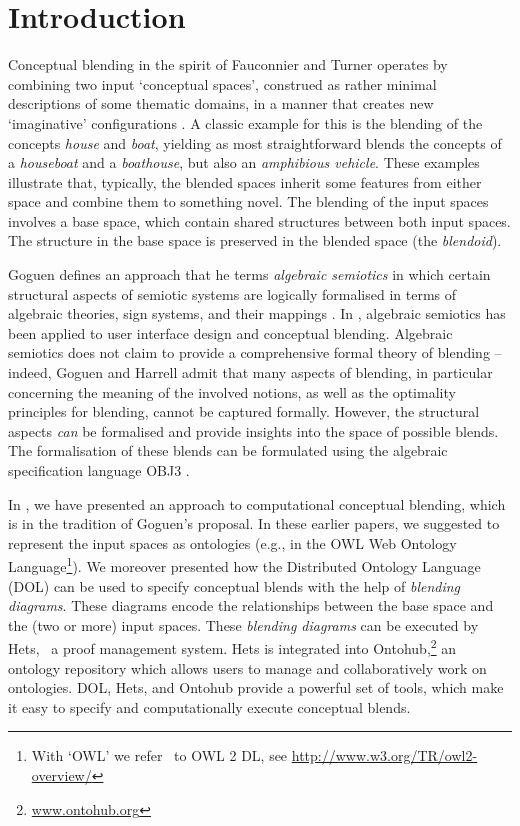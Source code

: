 \documentclass{ecai2012}
\newcommand{\OWL}{\textmd{\textsc{OWL}}\xspace}
\begin{document}
\section{Introduction}

Conceptual blending in the spirit of Fauconnier and Turner operates by
combining two input `conceptual spaces', construed as rather minimal
descriptions of some thematic domains, in a manner that creates new
`imaginative' configurations \citep{FauconnierTurner2003,Turner2014}. A classic example for this is the
blending of the concepts \emph{house} and \emph{boat}, yielding as
most straightforward blends the concepts of a \emph{houseboat} and a
\emph{boathouse}, but also an \emph{amphibious vehicle}. These examples
 illustrate that, typically, the blended spaces inherit some features from
  either space and combine them to something novel. The blending of the input 
spaces involves a base space, which contain shared structures between both input spaces. 
The structure in the base space is preserved in the blended space (the \emph{blendoid}). 

Goguen defines an approach that he terms \emph{algebraic semiotics} in 
 which certain structural aspects of semiotic systems are logically
  formalised in terms of algebraic theories, sign systems, and their mappings \citep{Goguen99}. 
%
In \cite{goguenharrell10}, algebraic
semiotics has been applied to user interface design and conceptual blending.
 Algebraic semiotics does not claim to provide a comprehensive formal theory of blending 
 -- indeed, Goguen and Harrell admit that many  aspects of blending, in particular concerning
  the meaning of the involved notions, as well as the optimality principles for blending, 
  cannot be captured formally.  However, the structural
aspects \emph{can} be formalised and provide insights into the space of possible blends. 
The formalisation of these blends can be formulated  using the algebraic specification language OBJ3 \citep{GoguenMalcolm96}. 


In \cite{HoisEtAl2010,blendingc3gi12,iccc14-ontohub}, we have presented an approach to computational conceptual blending,  which is in the tradition of Goguen's proposal. In these earlier papers, we suggested to represent the input  spaces as ontologies (e.g., in the OWL Web Ontology Language\footnote{With `\OWL' we refer \ to \OWL 2 DL, see \url{http://www.w3.org/TR/owl2-overview/}}). We moreover presented how  the Distributed Ontology Language (DOL) can be used to specify conceptual blends with the help
  of \emph{blending diagrams}. These diagrams encode the relationships between the base space 
  and the (two or more) input spaces. These \emph{blending diagrams} can be executed by Hets,
  \ a proof management system. Hets is integrated into Ontohub,\footnote{\url{www.ontohub.org}} 
  an ontology repository which allows users to manage and collaboratively work on ontologies.  DOL, Hets, and Ontohub provide a powerful set of tools,    which make it easy to specify and computationally execute conceptual blends. 
\end{document}
